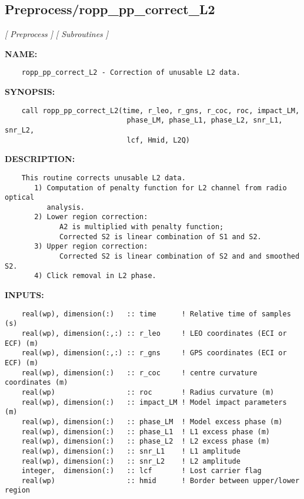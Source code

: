 \subsection{Preprocess/ropp\_pp\_correct\_L2}
\textsl{[ Preprocess ]}
\textsl{[ Subroutines ]}

\label{ch:robo68}
\label{ch:Preprocess_ropp_pp_correct_L2}
\textbf{NAME:}\hspace{0.08in}\begin{Verbatim}
    ropp_pp_correct_L2 - Correction of unusable L2 data.
\end{Verbatim}
\textbf{SYNOPSIS:}\hspace{0.08in}\begin{Verbatim}
    call ropp_pp_correct_L2(time, r_leo, r_gns, r_coc, roc, impact_LM, 
                             phase_LM, phase_L1, phase_L2, snr_L1, snr_L2,
                             lcf, Hmid, L2Q)
\end{Verbatim}
\textbf{DESCRIPTION:}\hspace{0.08in}\begin{Verbatim}
    This routine corrects unusable L2 data.
       1) Computation of penalty function for L2 channel from radio optical 
          analysis.
       2) Lower region correction:
             A2 is multiplied with penalty function;
             Corrected S2 is linear combination of S1 and S2.
       3) Upper region correction:
             Corrected S2 is linear combination of S2 and and smoothed S2.
       4) Click removal in L2 phase.
\end{Verbatim}
\textbf{INPUTS:}\hspace{0.08in}\begin{Verbatim}
    real(wp), dimension(:)   :: time      ! Relative time of samples (s)
    real(wp), dimension(:,:) :: r_leo     ! LEO coordinates (ECI or ECF) (m)
    real(wp), dimension(:,:) :: r_gns     ! GPS coordinates (ECI or ECF) (m)
    real(wp), dimension(:)   :: r_coc     ! centre curvature coordinates (m)
    real(wp)                 :: roc       ! Radius curvature (m)
    real(wp), dimension(:)   :: impact_LM ! Model impact parameters (m)
    real(wp), dimension(:)   :: phase_LM  ! Model excess phase (m)
    real(wp), dimension(:)   :: phase_L1  ! L1 excess phase (m)
    real(wp), dimension(:)   :: phase_L2  ! L2 excess phase (m)
    real(wp), dimension(:)   :: snr_L1    ! L1 amplitude
    real(wp), dimension(:)   :: snr_L2    ! L2 amplitude
    integer,  dimension(:)   :: lcf       ! Lost carrier flag  
    real(wp)                 :: hmid      ! Border between upper/lower region 
\end{Verbatim}

